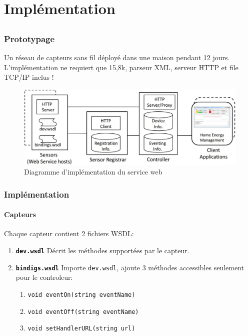 \section{Implémentation}
\subsection{}
\begin{frame}
 \frametitle{Prototypage}
 Un réseau de capteurs sans fil déployé dans une maison pendant 12 jours.
 L'implémentation ne requiert \alert{que 15,8k}, parseur XML, serveur HTTP et file TCP/IP inclus !
 \begin{figure}
  \centering
  \includegraphics[scale=0.36]{figures/implementation.jpg}
  \caption{Diagramme d'implémentation du service web}
 \end{figure} 
\end{frame}

\begin{frame}
 \frametitle{Implémentation}
 \framesubtitle{Capteurs}
 Chaque capteur contient 2 fichiers WSDL:
 \begin{enumerate}
  \item \textbf{\texttt{dev.wsdl}} Décrit les méthodes supportées par le capteur.
  \item \textbf{\texttt{bindigs.wsdl}} Importe \texttt{dev.wsdl}, ajoute 3 méthodes accessibles seulement pour le controleur:
   \begin{enumerate}
    \item \texttt{void eventOn(string eventName)}
    \item \texttt{void eventOff(string eventName)}
    \item \texttt{void setHandlerURL(string url)}
   \end{enumerate}
 \end{enumerate}
\end{frame}

